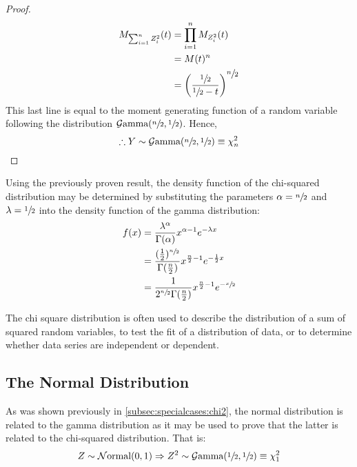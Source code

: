 \documentclass[12pt]{article}
\newcommand{\G}{\mathcal{G}}
\newcommand{\N}{\mathcal{N}}
\begin{document}
\begin{proof}
\begin{equation}
		\begin{split}
			M_{\sum^n_{i=1}Z^2_i}(t)	&=	\prod^n_{i=1}M_{Z^2_i}(t)\\
										&=	M(t)^n\\
										&=	\left(\frac{\sfrac{1}{2}}{\sfrac{1}{2}-t}\right)^{\displaystyle\sfrac{n}{2}}
		\end{split}
	\end{equation}
	This last line is equal to the moment generating function of a random variable following the distribution
	$\G\text{amma}(\sfrac{n}{2}, \sfrac{1}{2})$. Hence,
	\begin{equation}
		\therefore Y\sim\G\text{amma}(\sfrac{n}{2}, \sfrac{1}{2})\equiv \chi^2_n
	\end{equation}
\end{proof}

Using the previously proven result, the density function of the chi-squared distribution may be determined by
substituting the parameters $\alpha = \sfrac{n}{2}$ and $\lambda = \sfrac{1}{2}$ into the density function of the gamma
distribution:
\begin{equation}\label{eq:chisquared-density}
	\begin{split}
		f(x)	&=	\frac{\lambda^\alpha}{\Gamma(\alpha)}x^{\alpha-1}e^{-\lambda x}\\
				&=	\frac{(\frac{1}{2})^{\sfrac{n}{2}}}{\Gamma(\frac{n}{2})}x^{\frac{n}{2}-1}e^{-\frac{1}{2}x}\\
				&=	\frac{1}{2^{\sfrac{n}{2}}\Gamma(\frac{n}{2})}x^{\frac{n}{2}-1}e^{-\sfrac{x}{2}}
	\end{split}
\end{equation}

The chi square distribution is often used to describe the distribution of a sum of squared random variables, to test the
fit of a distribution of data, or to determine whether data series are independent or dependent.


\pagebreak
\subsection{The Normal Distribution}\label{subsec:specialcases:normal}
As was shown previously in \autoref{subsec:specialcases:chi2}, the normal distribution is related to the gamma
distribution as it may be used to prove that the latter is related to the chi-squared distribution. That is:
\begin{equation}
	Z\sim\N\text{ormal}(0, 1)\Rightarrow Z^2\sim\G\text{amma}(\sfrac{1}{2}, \sfrac{1}{2})\equiv\chi^2_1
\end{equation}
\end{document}
